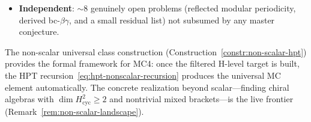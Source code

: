 \begin{remark}
\begin{itemize}
  physics-dictionary statements
  (${\sim}20$ conjectures across
  Chapters~\ref{ch:feynman}, \ref{ch:bv-brst},
  \ref{ch:ht-boundary}, \ref{chap:physical-origins},
  \ref{ch:kontsevich-integral}).
  This is strictly downstream of MC3/MC4 and should not be read as a
  parallel structural frontier.
\item \textbf{Independent}: ${\sim}8$ genuinely open problems
  (reflected modular periodicity, derived bc-$\beta\gamma$, and a
  small residual list) not subsumed by any master conjecture.
\end{itemize}
The non-scalar universal class construction
(Construction~\ref{constr:non-scalar-hpt}) provides the formal
framework for MC4: once the filtered H-level target is built,
the HPT recursion~\eqref{eq:hpt-nonscalar-recursion} produces the
universal MC element automatically.  The concrete realization beyond
scalar---finding chiral algebras with
$\dim H^2_{\mathrm{cyc}} \geq 2$ and nontrivial mixed
brackets---is the live frontier
(Remark~\ref{rem:non-scalar-landscape}).
\end{remark}

